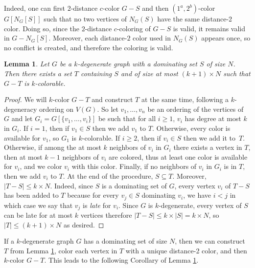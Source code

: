 \documentclass{article}
\newtheorem{lemma}[theorem]{Lemma}
\newcommand{\colo}[2]{(1^{#1}, 2^{#2})}
\begin{document}
Indeed, one can first $2$-distance $c$-color $G - S$ and then $\colo{a}{b}$-color $G[N_G[S]]$ such that no two vertices of $N_G(S)$ have the same distance-2 color. Doing so,  
since the $2$-distance $c$-coloring of $G - S$ is valid, it remains valid in $G - N_G[S]$. Moreover, each distance-$2$ color used in $N_G(S)$ appears once, so no conflict is created, and therefore the coloring is valid.

\begin{lemma}\label{lemma:k-degenerate-dominated-colo-bound}
     Let $G$ be a $k$-degenerate graph with a dominating set $S$ of size $N$. Then there exists a set $T$ containing $S$ and of size at most $(k + 1)\times N$ such that $G - T$ is $k$-colorable.
\end{lemma}

 \begin{proof}
    We will $k$-color $G - T$ and construct $T$ at the same time, following a $k$-degeneracy ordering on $V(G)$. So let $v_1, \dots, v_n$ be an ordering of the vertices of $G$ and let $G_i = G[\{v_1, \dots, v_i\}]$ be such that for all $i \geq 1$, $v_i$ has degree at most $k$ in $G_i$. If $i = 1$, then if $v_1 \in S$ then we add $v_1$ to $T$. Otherwise, every color is available for $v_1$, so $G_1$ is $k$-colorable. If $i \geq 2$, then if $v_i \in S$ then we add it to~$T$. Otherwise, if among the at most $k$ neighbors of $v_i$ in $G_i$ there exists a vertex in $T$, then at most $k - 1$ neighbors of $v_i$ are colored, thus at least one color is available for $v_i$, and we color $v_i$ with this color. Finally, if no neighbors of $v_i$ in $G_i$ is in $T$, then we add $v_i$ to $T$. At the end of the procedure, $S \subseteq T$. Moreover, $|T - S| \leq k\times N$. Indeed, since $S$ is a dominating set of $G$, every vertex $v_i$ of $T - S$ has been added to $T$ because for every $v_j \in S$ dominating $v_i$, we have $i < j$ in which case we say that $v_j$ is \emph{late} for $v_i$. Since $G$ is $k$-degenerate, every vertex of $S$ can be late for at most $k$ vertices therefore $|T - S| \leq k\times|S| = k\times N$, so $|T| \leq (k + 1)\times N$ as desired.
\end{proof}

If a $k$-degenerate graph $G$ has a dominating set of size $N$, then we can construct $T$ from Lemma \ref{lemma:k-degenerate-dominated-colo-bound}, color each vertex in $T$ with a unique distance-2 color, and then $k$-color $G - T$. This leads to the following Corollary of Lemma \ref{lemma:k-degenerate-dominated-colo-bound}.
\end{document}
